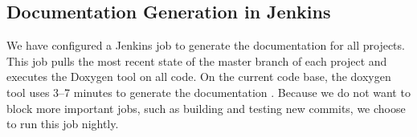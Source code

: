 \subsection{Documentation Generation in Jenkins}
We have configured a Jenkins job to generate the documentation for all projects. This job pulls the most recent state of the master branch of each project and executes the Doxygen tool on all code. On the current code base, the doxygen tool uses 3--7 minutes to generate the documentation . Because we do not want to block more important jobs, such as building and testing new commits, we choose to run this job nightly.
